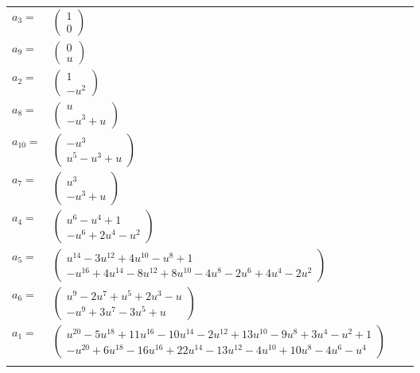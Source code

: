 \documentclass[1p]{elsarticle_modified}
\theoremstyle{definition}
\begin{document}
\begin{tabular}{m{7pt} m{180pt} m{7pt} m{180pt} }
\flushright $a_{3}=$&$\begin{pmatrix}1\\0\end{pmatrix}$ \\
\flushright $a_{9}=$&$\begin{pmatrix}0\\u\end{pmatrix}$ \\
\flushright $a_{2}=$&$\begin{pmatrix}1\\- u^2\end{pmatrix}$ \\
\flushright $a_{8}=$&$\begin{pmatrix}u\\- u^3+u\end{pmatrix}$ \\
\flushright $a_{10}=$&$\begin{pmatrix}- u^3\\u^5- u^3+u\end{pmatrix}$ \\
\flushright $a_{7}=$&$\begin{pmatrix}u^3\\- u^3+u\end{pmatrix}$ \\
\flushright $a_{4}=$&$\begin{pmatrix}u^6- u^4+1\\- u^6+2 u^4- u^2\end{pmatrix}$ \\
\flushright $a_{5}=$&$\begin{pmatrix}u^{14}-3 u^{12}+4 u^{10}- u^8+1\\- u^{16}+4 u^{14}-8 u^{12}+8 u^{10}-4 u^8-2 u^6+4 u^4-2 u^2\end{pmatrix}$ \\
\flushright $a_{6}=$&$\begin{pmatrix}u^9-2 u^7+u^5+2 u^3- u\\- u^9+3 u^7-3 u^5+u\end{pmatrix}$ \\
\flushright $a_{1}=$&$\begin{pmatrix}u^{20}-5 u^{18}+11 u^{16}-10 u^{14}-2 u^{12}+13 u^{10}-9 u^8+3 u^4- u^2+1\\- u^{20}+6 u^{18}-16 u^{16}+22 u^{14}-13 u^{12}-4 u^{10}+10 u^8-4 u^6- u^4\end{pmatrix}$\\&\end{tabular}
\end{document}
